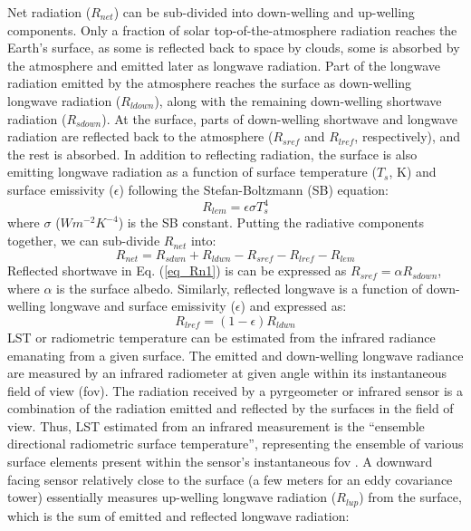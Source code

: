 \documentclass[fleqn,10pt]{wlscirep}
\begin{document}
Net radiation ($R_{net}$) can be sub-divided into down-welling and up-welling components. Only a fraction of solar top-of-the-atmosphere radiation reaches the Earth's surface, as some is reflected back to space by clouds, some is absorbed by the atmosphere and emitted later as longwave radiation. Part of the longwave radiation emitted by the atmosphere reaches the surface as down-welling longwave radiation ($R_{ldown}$), along with the remaining down-welling shortwave radiation ($R_{sdown}$). At the surface, parts of down-welling shortwave and longwave radiation are reflected back to the atmosphere ($R_{sref}$ and $R_{lref}$, respectively), and the rest is absorbed. In addition to reflecting radiation, the surface is also emitting longwave radiation as a function of surface temperature ($T_s$, K) and surface emissivity ($\epsilon$) following the Stefan-Boltzmann (SB) equation:
\begin{equation}\label{eq_Rlem}
R_{lem}= \epsilon \sigma T_{s}^{4}
\end{equation}
where $\sigma$ ($Wm^{-2}K^{-4}$) is the SB constant. 
Putting the radiative components together, we can sub-divide $R_{net}$ into:
\begin{equation}\label{eq_Rn1}
R_{net} = R_{sdwn} + R_{ldwn} - R_{sref} - R_{lref} - R_{lem}
\end{equation}
Reflected shortwave in Eq. ({\ref{eq_Rn1}}) is can be expressed as $R_{sref} = \alpha R_{sdown}$, where $\alpha$ is the surface albedo. Similarly, reflected longwave is a function of down-welling longwave and surface emissivity ($\epsilon$) and expressed as:
\begin{equation}\label{eq_Rlref}
R_{lref} = (1 - \epsilon) R_{ldwn} 
\end{equation}
LST or radiometric temperature can be estimated from the infrared radiance emanating from a given surface\cite{kustas2007utility}. The emitted and down-welling longwave radiance are measured by an infrared radiometer at given angle within its instantaneous field of view (fov). The radiation received by a pyrgeometer or infrared sensor is a combination of the radiation emitted and reflected by the surfaces in the field of view. Thus, LST estimated from an infrared measurement is the “ensemble directional radiometric surface temperature”, representing the ensemble of various surface elements present within the sensor's instantaneous fov \cite{norman1995terminology}. A downward facing sensor relatively close to the surface (a few meters for an eddy covariance tower) essentially measures up-welling longwave radiation ($R_{lup}$) from the surface, which is the sum of emitted and reflected longwave radiation:
\end{document}

